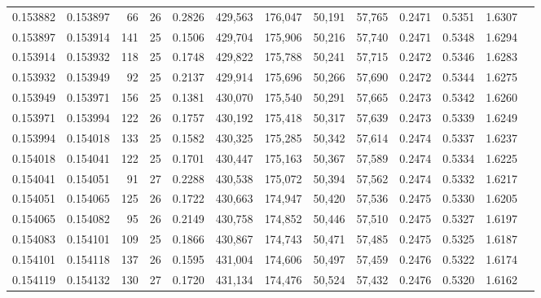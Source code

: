 \begin{tabular}{rrrrrrrrrrrrr}
0.153882 & 0.153897 &  66 &  26 &                                     0.2826 & 429,563 & 176,047 &  50,191 &  57,765 & 0.2471 & 0.5351 & 1.6307 \\
0.153897 & 0.153914 & 141 &  25 &                                     0.1506 & 429,704 & 175,906 &  50,216 &  57,740 & 0.2471 & 0.5348 & 1.6294 \\
0.153914 & 0.153932 & 118 &  25 &                                     0.1748 & 429,822 & 175,788 &  50,241 &  57,715 & 0.2472 & 0.5346 & 1.6283 \\
0.153932 & 0.153949 &  92 &  25 &                                     0.2137 & 429,914 & 175,696 &  50,266 &  57,690 & 0.2472 & 0.5344 & 1.6275 \\
0.153949 & 0.153971 & 156 &  25 &                                     0.1381 & 430,070 & 175,540 &  50,291 &  57,665 & 0.2473 & 0.5342 & 1.6260 \\
0.153971 & 0.153994 & 122 &  26 &                                     0.1757 & 430,192 & 175,418 &  50,317 &  57,639 & 0.2473 & 0.5339 & 1.6249 \\
0.153994 & 0.154018 & 133 &  25 &                                     0.1582 & 430,325 & 175,285 &  50,342 &  57,614 & 0.2474 & 0.5337 & 1.6237 \\
0.154018 & 0.154041 & 122 &  25 &                                     0.1701 & 430,447 & 175,163 &  50,367 &  57,589 & 0.2474 & 0.5334 & 1.6225 \\
0.154041 & 0.154051 &  91 &  27 &                                     0.2288 & 430,538 & 175,072 &  50,394 &  57,562 & 0.2474 & 0.5332 & 1.6217 \\
0.154051 & 0.154065 & 125 &  26 &                                     0.1722 & 430,663 & 174,947 &  50,420 &  57,536 & 0.2475 & 0.5330 & 1.6205 \\
0.154065 & 0.154082 &  95 &  26 &                                     0.2149 & 430,758 & 174,852 &  50,446 &  57,510 & 0.2475 & 0.5327 & 1.6197 \\
0.154083 & 0.154101 & 109 &  25 &                                     0.1866 & 430,867 & 174,743 &  50,471 &  57,485 & 0.2475 & 0.5325 & 1.6187 \\
0.154101 & 0.154118 & 137 &  26 &                                     0.1595 & 431,004 & 174,606 &  50,497 &  57,459 & 0.2476 & 0.5322 & 1.6174 \\
0.154119 & 0.154132 & 130 &  27 &                                     0.1720 & 431,134 & 174,476 &  50,524 &  57,432 & 0.2476 & 0.5320 & 1.6162 \\

\end{tabular}
